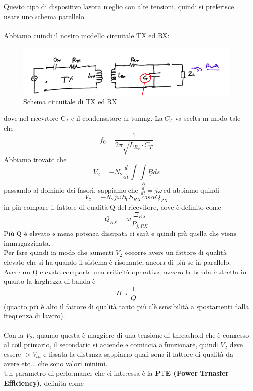 \documentclass[oneside, 12pt]{extbook}
\begin{document}
Questo tipo di dispositivo lavora meglio con alte tensioni, quindi si preferisce usare uno schema parallelo.\\\\Abbiamo quindi il nostro modello circuitale TX ed RX:
\begin{figure}
	\includegraphics[scale=1]{immagini/schema_circuitale.png}
	\caption{Schema circuitale di TX ed RX}
\end{figure}
dove nel ricevitore C$_T$ è il condensatore di tuning. La $C_T$ va scelta in modo tale che 
\begin{equation}
	f_0 = \frac{1}{2\pi\sqrt{L_{R_x} \cdot C_T}}
\end{equation}
Abbiamo trovato che
\begin{equation}
	V_2 = -N_2 \frac{d}{dt} \int\int\limits_{R} \underline{B} ds
\end{equation}
passando al dominio dei fasori, sappiamo che $\frac{d}{dt} = j\omega$ ed abbiamo quindi 
\begin{equation}
	V_2 = -N_2 j\omega B_0 S_{RX} cos\alpha Q_{RX}
\end{equation}
in più compare il fattore di qualità Q del ricevitore, dove è definito come 
\begin{equation}
	Q_{RX} = \omega \frac{\Xi_{RX}}{P_{j, RX}}
\end{equation}
Più Q è elevato e meno potenza dissipata ci sarà e quindi più quella che viene immagazzinata.\\Per fare quindi in modo che aumenti $V_2$ occorre avere un fattore di qualità elevato che si ha quando il sistema è risonante, ancora di più se in parallelo.\\Avere un Q elevato comporta una criticità operativa, ovvero la banda è stretta in quanto la larghezza di banda è 
\begin{equation}
	B \propto \frac{1}{Q}
\end{equation}
(quanto più è alto il fattore di qualità tanto più c'è sensibilità a spostamenti dalla frequenza di lavoro).\\\\Con la $V_2$, quando questa è maggiore di una tensione di threashold che è connesso al coil primario, il secondario si accende e comincia a funzionare, quindi $V_2$ deve essere $> V_{th}$ e fissata la distanza sappiamo quali sono il fattore di qualità da avere etc... che sono valori minimi.\\Un parametro di performance che ci interessa è la \textbf{PTE (Power Trnasfer Efficiency)}, definita come 
\end{document}
